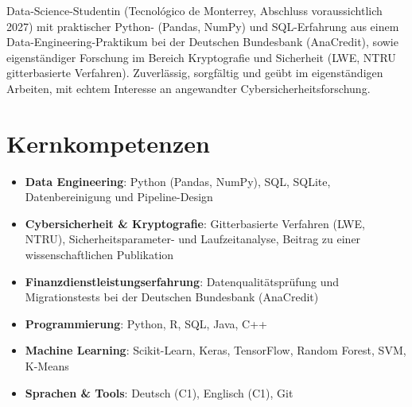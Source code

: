\documentclass[11pt,a4paper,sans]{moderncv}
\begin{document}
\makecvtitle


\vspace{6pt}
\small{Data-Science-Studentin (Tecnológico de Monterrey, Abschluss voraussichtlich 2027) mit praktischer Python- (Pandas, NumPy) und SQL-Erfahrung aus einem Data-Engineering-Praktikum bei der Deutschen Bundesbank (AnaCredit), sowie eigenständiger Forschung im Bereich Kryptografie und Sicherheit (LWE, NTRU gitterbasierte Verfahren). Zuverlässig, sorgfältig und geübt im eigenständigen Arbeiten, mit echtem Interesse an angewandter Cybersicherheitsforschung.}


\section{Kernkompetenzen}
\vspace{1pt}
\begin{itemize}

\item \textbf{Data Engineering}: Python (Pandas, NumPy), SQL, SQLite, Datenbereinigung und Pipeline-Design

\item \textbf{Cybersicherheit \& Kryptografie}: Gitterbasierte Verfahren (LWE, NTRU), Sicherheitsparameter- und Laufzeitanalyse, Beitrag zu einer wissenschaftlichen Publikation

\item \textbf{Finanzdienstleistungserfahrung}: Datenqualitätsprüfung und Migrationstests bei der Deutschen Bundesbank (AnaCredit)

\item \textbf{Programmierung}: Python, R, SQL, Java, C++

\item \textbf{Machine Learning}: Scikit-Learn, Keras, TensorFlow, Random Forest, SVM, K-Means

\item \textbf{Sprachen \& Tools}: Deutsch (C1), Englisch (C1), Git

\end{itemize}

\end{document}

